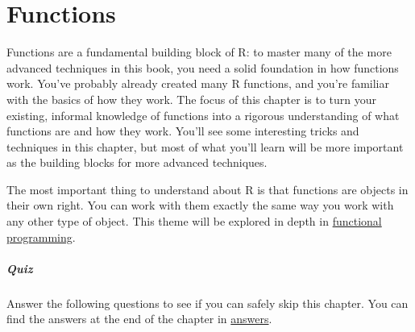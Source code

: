 \chapter{Functions}

Functions are a fundamental building block of R: to master many of the
more advanced techniques in this book, you need a solid foundation in
how functions work. You've probably already created many R functions,
and you're familiar with the basics of how they work. The focus of this
chapter is to turn your existing, informal knowledge of functions into a
rigorous understanding of what functions are and how they work. You'll
see some interesting tricks and techniques in this chapter, but most of
what you'll learn will be more important as the building blocks for more
advanced techniques. 

The most important thing to understand about R is that functions are
objects in their own right. You can work with them exactly the same way
you work with any other type of object. This theme will be explored in
depth in \hyperref[functional-programming]{functional programming}.

\paragraph{Quiz}

Answer the following questions to see if you can safely skip this
chapter. You can find the answers at the end of the chapter in
\hyperref[function-answers]{answers}.

